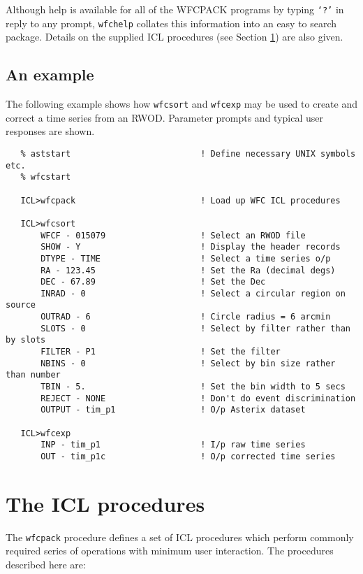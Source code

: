 Although help is available for all of the WFCPACK programs by typing
{\tt `?'} in reply to any prompt, {\tt wfchelp} collates this information
into an easy to search package. Details on the supplied ICL procedures
(see Section \ref{sec:procedures}) are also given.

\subsection{An example}
\label{sec:programs:example}

The following example shows how {\tt wfcsort} and {\tt wfcexp} may be
used to create and correct a time series from an RWOD. Parameter
prompts and typical user responses are shown.

\begin{verbatim}
   % aststart                          ! Define necessary UNIX symbols etc.
   % wfcstart			       

   ICL>wfcpack                         ! Load up WFC ICL procedures

   ICL>wfcsort
       WFCF - 015079                   ! Select an RWOD file
       SHOW - Y                        ! Display the header records
       DTYPE - TIME                    ! Select a time series o/p
       RA - 123.45                     ! Set the Ra (decimal degs)
       DEC - 67.89                     ! Set the Dec
       INRAD - 0                       ! Select a circular region on source
       OUTRAD - 6                      ! Circle radius = 6 arcmin
       SLOTS - 0                       ! Select by filter rather than by slots
       FILTER - P1                     ! Set the filter
       NBINS - 0                       ! Select by bin size rather than number
       TBIN - 5.                       ! Set the bin width to 5 secs
       REJECT - NONE                   ! Don't do event discrimination
       OUTPUT - tim_p1                 ! O/p Asterix dataset
 
   ICL>wfcexp
       INP - tim_p1                    ! I/p raw time series
       OUT - tim_p1c                   ! O/p corrected time series

\end{verbatim}

\section{The ICL procedures}
\label{sec:procedures}

The {\tt wfcpack} procedure defines a set of ICL procedures which perform
commonly required series of operations with minimum user interaction.
The procedures described here are:

